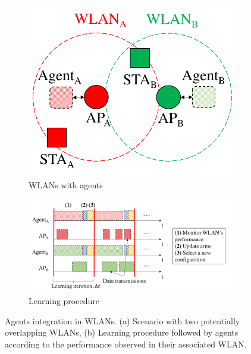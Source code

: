 \documentclass[preprint,12pt]{elsarticle}
\begin{document}
\begin{figure}[h!]
	\centering		
	\begin{subfigure}[b]{0.35\textwidth}
		\includegraphics[width=\textwidth]{agents_a}
		\caption{WLANs with agents}\label{fig:agents_a}
	\end{subfigure}
	\begin{subfigure}[b]{0.6\textwidth}
		\includegraphics[width=\textwidth]{agents_b}
		\caption{Learning procedure}\label{fig:agents_b}
	\end{subfigure}
	\caption{Agents integration in WLANs. (a) Scenario with two potentially overlapping WLANs, (b) Learning procedure followed by agents according to the performance observed in their associated WLAN.}
	\label{fig:agents}
\end{figure}
\end{document}

